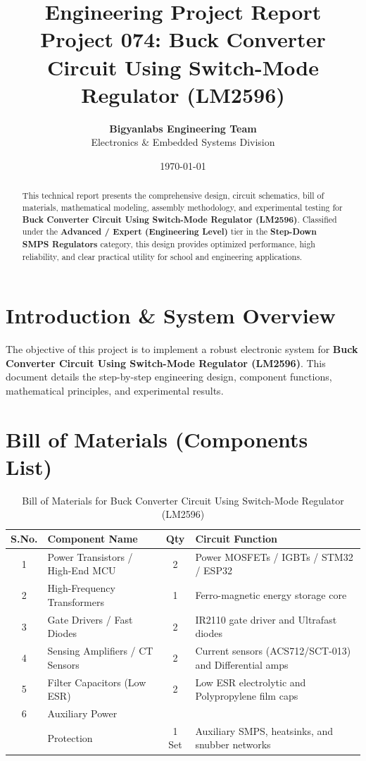 \documentclass[11pt,a4paper]{article}
\title{\textbf{\Huge Engineering Project Report}\\[0.5em] \Large Project 074: Buck Converter Circuit Using Switch-Mode Regulator (LM2596)}
\author{\textbf{Bigyanlabs Engineering Team}\\ Electronics \& Embedded Systems Division}
\date{\today}
\begin{document}
\maketitle
\thispagestyle{empty}

\begin{abstract}
This technical report presents the comprehensive design, circuit schematics, bill of materials, mathematical modeling, assembly methodology, and experimental testing for \textbf{Buck Converter Circuit Using Switch-Mode Regulator (LM2596)}. Classified under the \textbf{Advanced / Expert (Engineering Level)} tier in the \textbf{Step-Down SMPS Regulators} category, this design provides optimized performance, high reliability, and clear practical utility for school and engineering applications.
\end{abstract}

\newpage
\tableofcontents
\newpage

\section{Introduction \& System Overview}
The objective of this project is to implement a robust electronic system for \textbf{Buck Converter Circuit Using Switch-Mode Regulator (LM2596)}. This document details the step-by-step engineering design, component functions, mathematical principles, and experimental results.

\section{Bill of Materials (Components List)}
\begin{table}[h!]
\centering
\caption{Bill of Materials for Buck Converter Circuit Using Switch-Mode Regulator (LM2596)}
\vspace{0.5em}
\begin{tabular}{clcp{7cm}}
\toprule
\textbf{S.No.} & \textbf{Component Name} & \textbf{Qty} & \textbf{Circuit Function} \\
\midrule
1 & Power Transistors / High-End MCU & 2 & Power MOSFETs / IGBTs / STM32 / ESP32 \\
2 & High-Frequency Transformers & 1 & Ferro-magnetic energy storage core \\
3 & Gate Drivers / Fast Diodes & 2 & IR2110 gate driver and Ultrafast diodes \\
4 & Sensing Amplifiers / CT Sensors & 2 & Current sensors (ACS712/SCT-013) and Differential amps \\
5 & Filter Capacitors (Low ESR) & 2 & Low ESR electrolytic and Polypropylene film caps \\
6 & Auxiliary Power \\& Protection & 1 Set & Auxiliary SMPS, heatsinks, and snubber networks \\
\bottomrule
\end{tabular}
\end{table}
\end{document}
